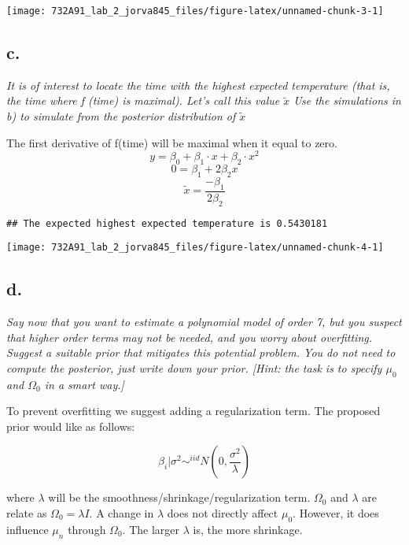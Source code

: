 \documentclass[]{article}
\begin{document}
\begin{center}\texttt{[image: 732A91\_lab\_2\_jorva845\_files/figure-latex/unnamed-chunk-3-1]} \end{center}

\hypertarget{c.}{%
\subsection{c.}\label{c.}}

\emph{It is of interest to locate the time with the highest expected
temperature (that is, the time where f (time) is maximal). Let's call
this value \(\widetilde{x}\) Use the simulations in b) to simulate from
the posterior distribution of \(\widetilde{x}\)}

The first derivative of f(time) will be maximal when it equal to zero.
\[ y= \beta_0+\beta_1\cdot x + \beta_2 \cdot x^2\]
\[0 = \beta_1 + 2\beta_2x\]
\[ \widetilde{x} = \frac{-\beta_1}{2\beta_2}\]

\begin{verbatim}
## The expected highest expected temperature is 0.5430181
\end{verbatim}

\begin{center}\texttt{[image: 732A91\_lab\_2\_jorva845\_files/figure-latex/unnamed-chunk-4-1]} \end{center}

\hypertarget{d.}{%
\subsection{d.}\label{d.}}

\emph{Say now that you want to estimate a polynomial model of order 7,
but you suspect that higher order terms may not be needed, and you worry
about overfitting. Suggest a suitable prior that mitigates this
potential problem. You do not need to compute the posterior, just write
down your prior. {[}Hint: the task is to specify \(\mu_0\) and
\(\Omega_0\) in a smart way.{]}}

To prevent overfitting we suggest adding a regularization term. The
proposed prior would like as follows:

\[\beta_i|\sigma^2\sim^{iid}N(0,\frac{\sigma^2}{\lambda})\]

where \(\lambda\) will be the smoothness/shrinkage/regularization term.
\(\Omega_0\) and \(\lambda\) are relate as \(\Omega_0 = \lambda I\). A
change in \(\lambda\) does not directly affect \(\mu_0\). However, it
does influence \(\mu_n\) through \(\Omega_0\). The larger \(\lambda\)
is, the more shrinkage.
\end{document}
